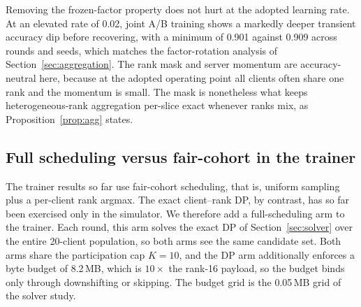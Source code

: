 \documentclass[preprint,12pt]{elsarticle}
\begin{document}
Removing the frozen-factor property does not hurt at the adopted learning rate. At an elevated rate of 0.02, joint A/B training shows a markedly deeper transient accuracy dip before recovering, with a minimum of 0.901 against 0.909 across rounds and seeds, which matches the factor-rotation analysis of Section~\ref{sec:aggregation}. The rank mask and server momentum are accuracy-neutral here, because at the adopted operating point all clients often share one rank and the momentum is small. The mask is nonetheless what keeps heterogeneous-rank aggregation per-slice exact whenever ranks mix, as Proposition~\ref{prop:agg} states.

\subsection{Full scheduling versus fair-cohort in the trainer}
\label{sec:dpvfair}
The trainer results so far use fair-cohort scheduling, that is, uniform sampling plus a per-client rank argmax. The exact client--rank DP, by contrast, has so far been exercised only in the simulator. We therefore add a full-scheduling arm to the trainer. Each round, this arm solves the exact DP of Section~\ref{sec:solver} over the entire 20-client population, so both arms see the same candidate set. Both arms share the participation cap $K{=}10$, and the DP arm additionally enforces a byte budget of 8.2\,MB, which is $10\times$ the rank-16 payload, so the budget binds only through downshifting or skipping. The budget grid is the 0.05\,MB grid of the solver study.

\begin{table}[H]
\centering
\caption{Full scheduling versus fair-cohort in the real trainer (non-IID CIFAR-10, nominal deadline, ten seeds): accuracy at round 40; network metrics averaged over rounds 30--39. Both arms share the candidate set (all 20 clients) and the participation cap $K{=}10$; the DP arm additionally enforces an 8.2\,MB byte budget.}
\label{tab:dpvfair}
\end{table}
\end{document}
